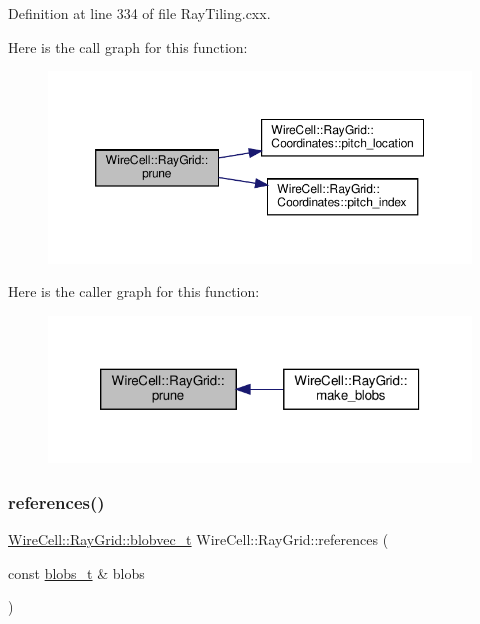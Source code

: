 Definition at line 334 of file Ray\+Tiling.\+cxx.

Here is the call graph for this function\+:
\nopagebreak
\begin{figure}[H]
\begin{center}
\leavevmode
\includegraphics[width=350pt]{namespace_wire_cell_1_1_ray_grid_a7d64051adfd2d6d4b1264d7efd841439_cgraph}
\end{center}
\end{figure}
Here is the caller graph for this function\+:
\nopagebreak
\begin{figure}[H]
\begin{center}
\leavevmode
\includegraphics[width=320pt]{namespace_wire_cell_1_1_ray_grid_a7d64051adfd2d6d4b1264d7efd841439_icgraph}
\end{center}
\end{figure}
\mbox{\label{namespace_wire_cell_1_1_ray_grid_a1f3f06c1120d6202ac80459d28c4afa4}} 
\subsubsection{\texorpdfstring{references()}{references()}}
{\footnotesize\ttfamily \hyperlink{namespace_wire_cell_1_1_ray_grid_a3154c64db4d07056418dfcd1afbf0531}{Wire\+Cell\+::\+Ray\+Grid\+::blobvec\+\_\+t} Wire\+Cell\+::\+Ray\+Grid\+::references (\begin{DoxyParamCaption}\item[{const \hyperlink{namespace_wire_cell_1_1_ray_grid_aea2069aff62790df3241ee7446e81ade}{blobs\+\_\+t} \&}]{blobs }\end{DoxyParamCaption})}



